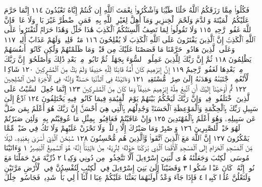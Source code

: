 فَكُلُوا۟ مِمَّا رَزَقَكُمُ ٱللَّهُ حَلَٰلࣰا طَيِّبࣰا وَٱشْكُرُوا۟
نِعْمَتَ ٱللَّهِ إِن كُنتُمْ إِيَّاهُ تَعْبُدُونَ ١١٤ إِنَّمَا حَرَّمَ
عَلَيْكُمُ ٱلْمَيْتَةَ وَٱلدَّمَ وَلَحْمَ ٱلْخِنزِيرِ وَمَآ أُهِلَّ لِغَيْرِ
ٱللَّهِ بِهِۦۖ فَمَنِ ٱضْطُرَّ غَيْرَ بَاغࣲ وَلَا عَادࣲ فَإِنَّ ٱللَّهَ غَفُورࣱ
رَّحِيمࣱ ١١٥ وَلَا تَقُولُوا۟ لِمَا تَصِفُ أَلْسِنَتُكُمُ ٱلْكَذِبَ
هَٰذَا حَلَٰلࣱ وَهَٰذَا حَرَامࣱ لِّتَفْتَرُوا۟ عَلَى ٱللَّهِ ٱلْكَذِبَۚ إِنَّ
ٱلَّذِينَ يَفْتَرُونَ عَلَى ٱللَّهِ ٱلْكَذِبَ لَا يُفْلِحُونَ ١١٦ مَتَٰعࣱ قَلِيلࣱ
وَلَهُمْ عَذَابٌ أَلِيمࣱ ١١٧ وَعَلَى ٱلَّذِينَ هَادُوا۟ حَرَّمْنَا مَا قَصَصْنَا عَلَيْكَ
مِن قَبْلُۖ وَمَا ظَلَمْنَٰهُمْ وَلَٰكِن كَانُوٓا۟ أَنفُسَهُمْ يَظْلِمُونَ ١١٨
ثُمَّ إِنَّ رَبَّكَ لِلَّذِينَ عَمِلُوا۟ ٱلسُّوٓءَ بِجَهَٰلَةࣲ ثُمَّ تَابُوا۟ مِنۢ بَعْدِ
ذَٰلِكَ وَأَصْلَحُوٓا۟ إِنَّ رَبَّكَ مِنۢ بَعْدِهَا لَغَفُورࣱ رَّحِيمٌ ١١٩ إِنَّ
إِبْرَٰهِيمَ كَانَ أُمَّةࣰ قَانِتࣰا لِّلَّهِ حَنِيفࣰا وَلَمْ يَكُ مِنَ ٱلْمُشْرِكِينَ ١٢٠
شَاكِرࣰا لِّأَنْعُمِهِۚ ٱجْتَبَىٰهُ وَهَدَىٰهُ إِلَىٰ صِرَٰطࣲ مُّسْتَقِيمࣲ ١٢١
وَءَاتَيْنَٰهُ فِي ٱلدُّنْيَا حَسَنَةࣰۖ وَإِنَّهُۥ فِي ٱلْأٓخِرَةِ لَمِنَ ٱلصَّٰلِحِينَ ١٢٢
ثُمَّ أَوْحَيْنَآ إِلَيْكَ أَنِ ٱتَّبِعْ مِلَّةَ إِبْرَٰهِيمَ حَنِيفࣰاۖ وَمَا كَانَ
مِنَ ٱلْمُشْرِكِينَ ١٢٣ إِنَّمَا جُعِلَ ٱلسَّبْتُ عَلَى ٱلَّذِينَ ٱخْتَلَفُوا۟
فِيهِۚ وَإِنَّ رَبَّكَ لَيَحْكُمُ بَيْنَهُمْ يَوْمَ ٱلْقِيَٰمَةِ فِيمَا
كَانُوا۟ فِيهِ يَخْتَلِفُونَ ١٢٤ ٱدْعُ إِلَىٰ سَبِيلِ رَبِّكَ بِٱلْحِكْمَةِ
وَٱلْمَوْعِظَةِ ٱلْحَسَنَةِۖ وَجَٰدِلْهُم بِٱلَّتِي هِيَ أَحْسَنُۚ إِنَّ رَبَّكَ
هُوَ أَعْلَمُ بِمَن ضَلَّ عَن سَبِيلِهِۦ وَهُوَ أَعْلَمُ بِٱلْمُهْتَدِينَ ١٢٥
وَإِنْ عَاقَبْتُمْ فَعَاقِبُوا۟ بِمِثْلِ مَا عُوقِبْتُم بِهِۦۖ وَلَئِن
صَبَرْتُمْ لَهُوَ خَيْرࣱ لِّلصَّٰبِرِينَ ١٢٦ وَٱصْبِرْ وَمَا صَبْرُكَ
إِلَّا بِٱللَّهِۚ وَلَا تَحْزَنْ عَلَيْهِمْ وَلَا تَكُ فِي ضَيْقࣲ مِّمَّا يَمْكُرُونَ ١٢٧
إِنَّ ٱللَّهَ مَعَ ٱلَّذِينَ ٱتَّقَوا۟ وَّٱلَّذِينَ هُم مُّحْسِنُونَ ١٢٨
سُبْحَٰنَ ٱلَّذِيٓ أَسْرَىٰ بِعَبْدِهِۦ لَيْلࣰا مِّنَ ٱلْمَسْجِدِ ٱلْحَرَامِ إِلَى
ٱلْمَسْجِدِ ٱلْأَقْصَا ٱلَّذِي بَٰرَكْنَا حَوْلَهُۥ لِنُرِيَهُۥ مِنْ ءَايَٰتِنَآۚ إِنَّهُۥ
هُوَ ٱلسَّمِيعُ ٱلْبَصِيرُ ١ وَءَاتَيْنَا مُوسَى ٱلْكِتَٰبَ وَجَعَلْنَٰهُ
هُدࣰى لِّبَنِيٓ إِسْرَٰٓءِيلَ أَلَّا تَتَّخِذُوا۟ مِن دُونِي وَكِيلࣰا ٢
ذُرِّيَّةَ مَنْ حَمَلْنَا مَعَ نُوحٍۚ إِنَّهُۥ كَانَ عَبْدࣰا شَكُورࣰا ٣
وَقَضَيْنَآ إِلَىٰ بَنِيٓ إِسْرَٰٓءِيلَ فِي ٱلْكِتَٰبِ لَتُفْسِدُنَّ فِي ٱلْأَرْضِ
مَرَّتَيْنِ وَلَتَعْلُنَّ عُلُوࣰّا كَبِيرࣰا ٤ فَإِذَا جَآءَ وَعْدُ أُولَىٰهُمَا
بَعَثْنَا عَلَيْكُمْ عِبَادࣰا لَّنَآ أُو۟لِي بَأْسࣲ شَدِيدࣲ فَجَاسُوا۟ خِلَٰلَ
